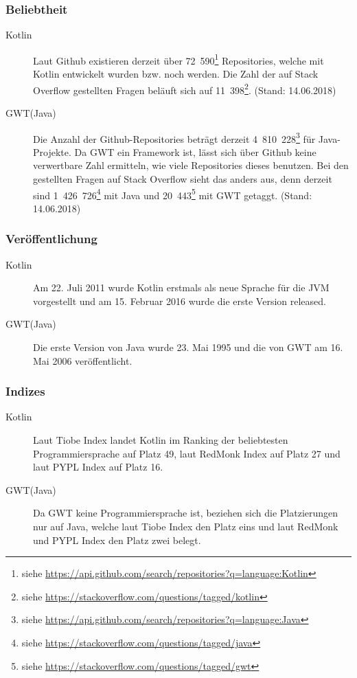 \subsubsection{Beliebtheit}
\begin{description}
	\item[Kotlin] Laut Github existieren derzeit über 72~590\footnote{siehe \url{https://api.github.com/search/repositories?q=language:Kotlin}} Repositories, welche mit Kotlin entwickelt wurden bzw. noch werden. Die Zahl der auf Stack Overflow gestellten Fragen beläuft sich auf 11~398\footnote{siehe \url{https://stackoverflow.com/questions/tagged/kotlin}}. (Stand: 14.06.2018)
	\item[GWT(Java)] Die Anzahl der Github-Repositories beträgt derzeit 4~810~228\footnote{siehe \url{https://api.github.com/search/repositories?q=language:Java}} für Java-Projekte. Da \gls{GWT} ein Framework ist, lässt sich über Github keine verwertbare Zahl ermitteln, wie viele Repositories dieses benutzen. Bei den gestellten Fragen auf Stack Overflow sieht das anders aus, denn derzeit sind 1~426~726\footnote{siehe \url{https://stackoverflow.com/questions/tagged/java}} mit Java und 20~443\footnote{siehe \url{https://stackoverflow.com/questions/tagged/gwt}} mit \gls{GWT} getaggt. (Stand: 14.06.2018)
\end{description}

\subsubsection{Veröffentlichung}
\begin{description}
	\item[Kotlin] Am 22. Juli 2011 wurde Kotlin erstmals als neue Sprache für die \gls{JVM} vorgestellt und am 15. Februar 2016 wurde die erste Version released. \cite{kotlinNewForJVM, kotlinRelease}
	\item[GWT(Java)] Die erste Version von Java wurde 23. Mai 1995 und die von \gls{GWT} am 16. Mai 2006 veröffentlicht. \cite{javaRelease, gwtRelease}
\end{description}

\subsubsection{Indizes}
\begin{description}
	\item[Kotlin] Laut Tiobe Index landet Kotlin im Ranking der beliebtesten Programmiersprache auf Platz 49, laut RedMonk Index auf Platz 27 und laut PYPL Index auf Platz 16. \cite{tiobeIndex, redMonkIndex, pyplIndex}
	\item[GWT(Java)] Da \gls{GWT} keine Programmiersprache ist, beziehen sich die Platzierungen nur auf Java, welche laut Tiobe Index den Platz eins und laut RedMonk und PYPL Index den Platz zwei belegt. \cite{tiobeIndex, redMonkIndex, pyplIndex}
\end{description}


